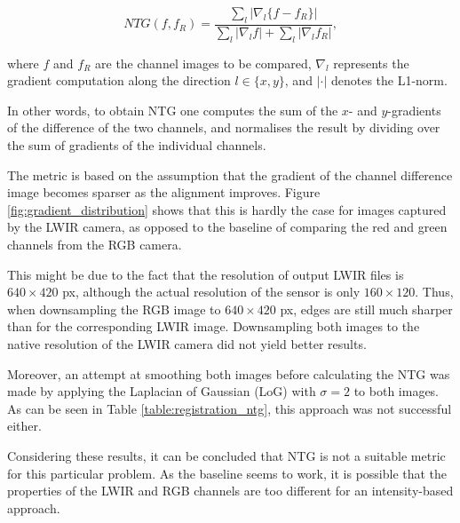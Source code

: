 \documentclass{l4proj}
\begin{document}
\begin{equation}
  NTG(f, f_R) = \frac{\sum_l |\nabla_l \{f - f_R\}|}{\sum_l | \nabla_l f | + \sum_l | \nabla_l f_R|},
\end{equation}

where $f$ and $f_R$ are the channel images to be compared, $\nabla_l$ represents the gradient computation along the direction $l \in \{x, y\}$, and $| \cdot |$ denotes the L1-norm.

In other words, to obtain NTG one computes the sum of the $x$- and $y$-gradients of the difference of the two channels, and normalises the result by dividing over the sum of gradients of the individual channels.

The metric is based on the assumption that the gradient of the channel difference image becomes sparser as the alignment improves. Figure \ref{fig:gradient_distribution} shows that this is hardly the case for images captured by the LWIR camera, as opposed to the baseline of comparing the red and green channels from the RGB camera.

This might be due to the fact that the resolution of output LWIR files is $640 \times 420$ px, although the actual resolution of the sensor is only $160 \times 120$. Thus, when downsampling the RGB image to $640 \times 420$ px, edges are still much sharper than for the corresponding LWIR image. Downsampling both images to the native resolution of the LWIR camera did not yield better results.

Moreover, an attempt at smoothing both images before calculating the NTG was made by applying the Laplacian of Gaussian (LoG) with $\sigma=2$ to both images. As can be seen in Table \ref{table:registration_ntg}, this approach was not successful either. 

Considering these results, it can be concluded that NTG is not a suitable metric for this particular problem. As the baseline seems to work, it is possible that the properties of the LWIR and RGB channels are too different for an intensity-based approach.
\end{document}
